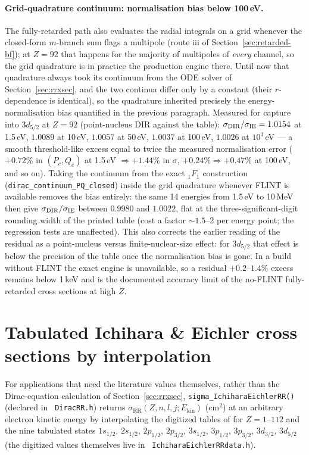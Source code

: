 \documentclass[11pt,a4paper]{article}
\begin{document}
\paragraph{Grid-quadrature continuum: normalisation bias below 100\,eV.}
The fully-retarded path also evaluates the radial integrals on a grid
whenever the closed-form $m$-branch sum flags a multipole (route iii of
Section~\ref{sec:retarded-bf}); at $Z=92$ that happens for the majority of
multipoles of \emph{every} channel, so the grid quadrature is in practice
the production engine there.  Until now that quadrature always took its
continuum from the ODE solver of Section~\ref{sec:rrxsec}, and the two
continua differ only by a constant (their $r$-dependence is identical), so
the quadrature inherited precisely the energy-normalisation bias quantified
in the previous paragraph.  Measured for capture into $3d_{5/2}$ at
$Z=92$ (point-nucleus DIR against the table):
$\sigma_{\rm DIR}/\sigma_{\rm IE}=1.0154$ at 1.5\,eV, $1.0089$ at 10\,eV,
$1.0057$ at 50\,eV, $1.0037$ at 100\,eV, $1.0026$ at $10^{3}$\,eV --- a
smooth threshold-like excess equal to twice the measured normalisation
error ($+0.72\%$ in $(P_c,Q_c)$ at 1.5\,eV $\Rightarrow+1.44\%$ in
$\sigma$, $+0.24\%\Rightarrow+0.47\%$ at 100\,eV, and so on).  Taking the
continuum from the exact ${}_{1}F_{1}$ construction
({\tt dirac\_continuum\_PQ\_closed}) inside the grid quadrature whenever
FLINT is available removes the bias entirely: the same 14 energies from
1.5\,eV to 10\,MeV then give $\sigma_{\rm DIR}/\sigma_{\rm IE}$ between
$0.9980$ and $1.0022$, flat at the three-significant-digit rounding width
of the printed table (cost a factor $\sim1.5$--2 per energy point; the
regression tests are unaffected).  This also corrects the earlier reading
of the residual as a point-nucleus versus finite-nuclear-size effect: for
$3d_{5/2}$ that effect is below the precision of the table once the
normalisation bias is gone.  In a build without FLINT the exact engine is
unavailable, so a residual $+0.2$--$1.4\%$ excess remains below 1\,keV
and is the documented accuracy limit of the no-FLINT fully-retarded cross
sections at high $Z$.

\section{Tabulated Ichihara \& Eichler cross sections by interpolation}
\label{sec:ichihara-interp}

For applications that need the literature values themselves, rather
than the Dirac-equation calculation of Section~\ref{sec:rrxsec},
{\tt sigma\_IchiharaEichlerRR()} (declared in {\tt
DiracRR.h}) returns $\sigma_{\mathrm{RR}}(Z,n,l,j;
E_{\mathrm{kin}})$ (cm$^{2}$) at an arbitrary electron kinetic energy
by interpolating the digitized tables of \cite{Ichihara2000} for
$Z=1$--$112$ and the nine tabulated states $1s_{1/2}$, $2s_{1/2}$,
$2p_{1/2}$, $2p_{3/2}$, $3s_{1/2}$, $3p_{1/2}$, $3p_{3/2}$,
$3d_{3/2}$, $3d_{5/2}$ (the digitized values themselves live in {\tt
IchiharaEichlerRRdata.h}).
\end{document}
